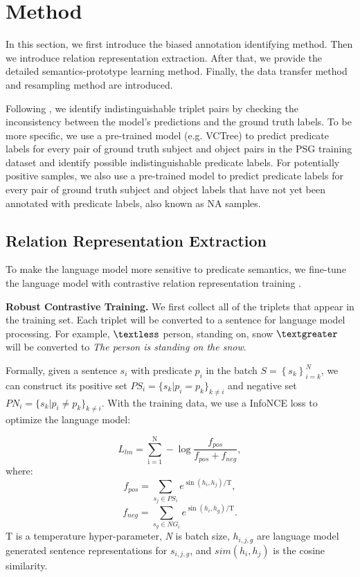 \documentclass[letterpaper]{article} %
\begin{document}
\section{Method}
In this section, we first introduce the biased annotation identifying method. Then we introduce relation representation extraction. After that, we provide the detailed semantics-prototype learning method. Finally, the data transfer method and resampling method are introduced.


 Following \citet{zhang2022fine}, we identify indistinguishable triplet pairs by checking the inconsistency between the model's predictions and the ground truth labels. To be more specific, we use a pre-trained model (e.g. VCTree\cite{Tang_2019_CVPR}) to predict predicate labels for every pair of ground truth subject and object pairs in the PSG training dataset and identify possible indistinguishable predicate labels.
For potentially positive samples, we also use a pre-trained model to predict predicate labels for every pair of ground truth subject and object labels that have not yet been annotated with predicate labels, also known as NA samples.







\subsection{Relation Representation Extraction}
\label{RRE}
To make the language model more sensitive to predicate semantics, we fine-tune the language model with contrastive relation representation training \cite{li2022hero}.

\noindent \textbf{Robust Contrastive Training.} We first collect all of the triplets that appear in the training set.
Each triplet will be converted to a sentence for language model processing.
For example, $\textless$ person, standing on, snow $\textgreater$ will be converted to \textit{The person is standing on the snow}.

Formally, given a sentence $s_i$ with predicate $p_i$ in the batch $S=\left\{s_k\right\}_{i=k}^N$, we can construct its positive set ${PS}_i=\{s_k|p_i=p_k \}_{k\neq i}$ and negative set ${PN}_i=\{s_k|p_i \neq p_k \}_{k\neq i}$.
With the training data, we use a InfoNCE loss to optimize the language model:

\begin{equation}
\label{eq:rct}
L_{l m}=
\sum_{\mathrm{i}=1}^{\mathrm{N}}-\log \frac{f_{pos}}{f_{pos}+f_{neg}} ,
\end{equation}
where:
\begin{equation}
    f_{pos} = \sum_{s_{j} \in P S_{i}} e^{\sin \left(h_{i}, h_{j}\right) / \mathrm{T}},
\end{equation}
\begin{equation}
    f_{neg} = \sum_{s_{g} \in N G_{i}} e^{\sin \left(h_{i}, h_{g}\right) / \mathrm{T}}.
\end{equation}
$\mathrm{T}$ is a temperature hyper-parameter, \textit{N} is batch size, $h_{i,j,g}$ are language model generated sentence representations for $s_{i,j,g}$, and $sim\left(h_i,h_j\right)$ is the cosine similarity.
\end{document}
